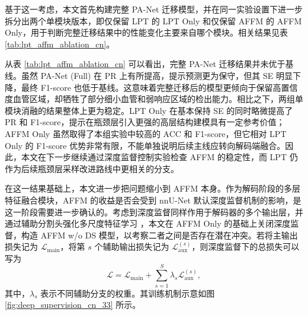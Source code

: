 \documentclass[a4paper,12pt]{article}
\begin{document}
基于这一考虑，本文首先构建完整 PA-Net 迁移模型，并在同一实验设置下进一步拆分出两个单模块版本，即仅保留 LPT 的 LPT Only 和仅保留 AFFM 的 AFFM Only，用于判断完整迁移结果中的性能变化主要来自哪个模块。相关结果见表 \ref{tab:lpt_affm_ablation_cn}。

\begin{table}[htbp]
\centering
\caption{PA-Net 模块迁移与消融实验结果对比}
\label{tab:lpt_affm_ablation_cn}
\end{table}

从表 \ref{tab:lpt_affm_ablation_cn} 可以看出，完整 PA-Net 迁移结果并未优于基线。虽然 PA-Net (Full) 在 PR 上有所提高，提示预测更为保守，但其 SE 明显下降，最终 F1-score 也低于基线。这意味着完整迁移后的模型更倾向于保留高置信度血管区域，却牺牲了部分细小血管和弱响应区域的检出能力。相比之下，两组单模块消融的结果整体上更为稳定。LPT Only 在基本保持 SE 的同时略微提高了 PR 和 F1-score，提示在瓶颈层引入更强的高层结构建模具有一定参考价值；AFFM Only 虽然取得了本组实验中较高的 ACC 和 F1-score，但它相对 LPT Only 的 F1-score 优势非常有限，不能单独说明后续主线应转向解码端融合。因此，本文在下一步继续通过深度监督控制实验检查 AFFM 的稳定性，而 LPT 仍作为后续瓶颈层采样改进路线中更相关的分支。

在这一结果基础上，本文进一步把问题缩小到 AFFM 本身。作为解码阶段的多层特征融合模块，AFFM 的收益是否会受到 nnU-Net 默认深度监督机制的影响，是这一阶段需要进一步确认的。考虑到深度监督同样作用于解码器的多个输出层，并通过辅助分割头强化多尺度特征学习 \cite{isensee2021nnunet,lee2015dsn}，本文在 AFFM Only 的基础上关闭深度监督，构造 AFFM w/o DS 模型，以考察二者之间是否存在潜在冲突。若将主输出损失记为 \(\mathcal{L}_{\mathrm{main}}\)，将第 \(s\) 个辅助输出损失记为 \(\mathcal{L}_{\mathrm{aux}}^{(s)}\)，则深度监督下的总损失可以写为
\[
\mathcal{L} = \mathcal{L}_{\mathrm{main}} + \sum_{s=1}^{S}\lambda_s \mathcal{L}_{\mathrm{aux}}^{(s)},
\]
其中，\(\lambda_s\) 表示不同辅助分支的权重。其训练机制示意如图 \ref{fig:deep_supervision_cn_33} 所示。
\end{document}
